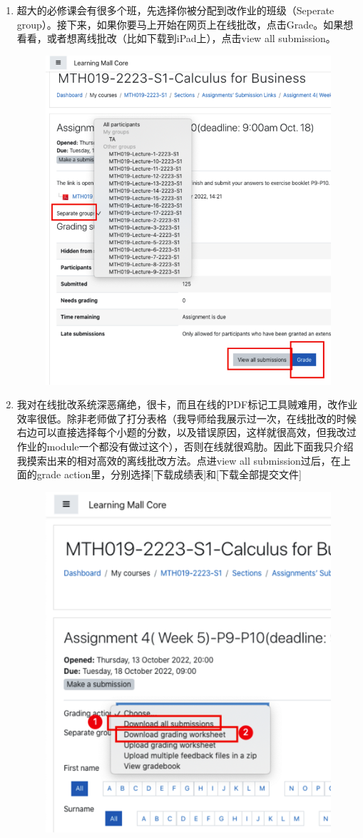 \begin{enumerate}
    \item 超大的必修课会有很多个班，先选择你被分配到改作业的班级（Seperate group）。接下来，如果你要马上开始在网页上在线批改，点击Grade。如果想看看，或者想离线批改（比如下载到iPad上），点击view all submission。
        \begin{figure}[H]
            \centering
            \includegraphics[width=0.5\columnwidth]{author-folder/Kai.Wu/LMO_inside_submission.png}
        \end{figure}
    \item 我对在线批改系统深恶痛绝，很卡，而且在线的PDF标记工具贼难用，改作业效率很低。除非老师做了打分表格（我导师给我展示过一次，在线批改的时候右边可以直接选择每个小题的分数，以及错误原因，这样就很高效，但我改过作业的module一个都没有做过这个），否则在线就很鸡肋。因此下面我只介绍我摸索出来的相对高效的离线批改方法。点进view all submission过后，在上面的grade action里，分别选择[下载成绩表]和[下载全部提交文件]
        \begin{figure}[H]
            \centering
            \includegraphics[width=0.5\columnwidth]{author-folder/Kai.Wu/LMO_download.png}

\end{figure}
\end{enumerate}

